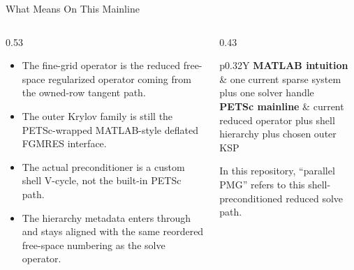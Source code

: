 \documentclass[aspectratio=169,10pt]{beamer}
\begin{document}
\begin{frame}{What  Means On This Mainline}
\small
\begin{columns}[T,totalwidth=\textwidth]
\begin{column}{0.53\textwidth}
\begin{softbox}
\begin{itemize}
  \item The fine-grid operator is the reduced free-space regularized operator coming from the owned-row tangent path.
  \item The outer Krylov family is still the PETSc-wrapped MATLAB-style deflated FGMRES interface.
  \item The actual preconditioner is a custom shell V-cycle, not the built-in PETSc  path.
  \item The hierarchy metadata enters through  and stays aligned with the same reordered free-space numbering as the solve operator.
\end{itemize}
\end{softbox}
\end{column}
\begin{column}{0.43\textwidth}
\begin{tabularx}{\linewidth}{p{0.32\linewidth}Y}
\toprule
\textbf{MATLAB intuition} & one current sparse system plus one solver handle \\
\midrule
\textbf{PETSc mainline} & current reduced operator plus shell hierarchy plus chosen outer KSP \\
\bottomrule
\end{tabularx}
\vspace{0.16cm}
\begin{callout}
In this repository, ``parallel PMG'' refers to this shell-preconditioned reduced solve path.
\end{callout}
\end{column}
\end{columns}
\end{frame}
\end{document}

